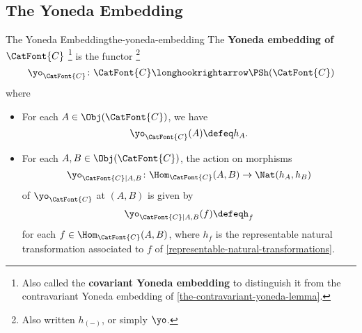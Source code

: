 \subsection{The Yoneda Embedding}\label{subsection-the-yoneda-embedding}
\begin{definition}{The Yoneda Embedding}{the-yoneda-embedding}%
    The \textbf{Yoneda embedding of $\CatFont{C}$}%
    \footnote{%
        Also called the \textbf{covariant Yoneda embedding} to distinguish it from the contravariant Yoneda embedding of \cref{the-contravariant-yoneda-lemma}.
    } %
    is the functor%
    \footnote{%
        Also written $h_{(-)}$, or simply $\yo$.
        \par\vspace*{-1.75\baselineskip}
    } %
    \[
        \yo_{\CatFont{C}}%
        \colon%
        \CatFont{C}%
        \longhookrightarrow%
        \PSh(\CatFont{C})%
    \]%
    where
    \begin{itemize}
        \item{}For each $A\in\Obj(\CatFont{C})$, we have
            \[
                \yo_{\CatFont{C}}(A)
                \defeq
                h_{A}.
            \]%
        \item{}For each $A,B\in\Obj(\CatFont{C})$, the action on morphisms
            \[
                \yo_{\CatFont{C}|A,B}%
                \colon%
                \Hom_{\CatFont{C}}(A,B)%
                \to%
                \Nat(h_{A},h_{B})%
            \]%
            of $\yo_{\CatFont{C}}$ at $(A,B)$ is given by
            \[
                \yo_{\CatFont{C}|A,B}(f)%
                \defeq%
                h_{f}%
            \]%
            for each $f\in\Hom_{\CatFont{C}}(A,B)$, where $h_{f}$ is the representable natural transformation associated to $f$ of \cref{representable-natural-transformations}.
    \end{itemize}
\end{definition}
